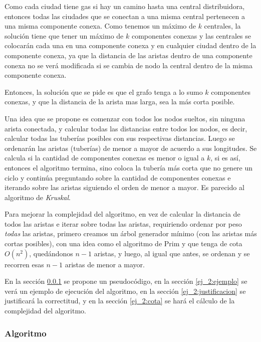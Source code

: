 Como cada ciudad tiene gas si hay un camino hasta una central distribuidora, entonces todas las ciudades que se conectan
a una misma central pertenecen a una misma componente conexa. Como tenemos un m\'aximo de $k$ centrales, la soluci\'on tiene que tener un m\'aximo de $k$ componentes conexas y las centrales se colocar\'an cada una en una componente conexa y en cualquier ciudad dentro de la componente conexa, ya que la distancia de las aristas dentro de una componente conexa no se ver\'a modificada si se cambia de nodo la central dentro de la misma componente conexa.

Entonces, la soluci\'on que se pide es que el grafo tenga a lo sumo $k$ componentes conexas, y que la distancia de la arista mas larga, sea la m\'as corta posible.

Una idea que se propone es comenzar con todos los nodos sueltos, sin ninguna arista conectada,
y calcular todas las distancias entre todos los nodos, es decir, calcular todas las tuber\'ias posibles con sus respectivas distancias.
Luego se ordenar\'an las aristas (tuber\'ias) de menor a mayor de acuerdo a sus longitudes.
Se calcula si la cantidad de componentes conexas es menor o igual a $k$, si es as\'i, entonces el algoritmo termina, sino coloca la tuber\'ia m\'as corta que no genere un ciclo y contin\'ua preguntando sobre la cantidad de componentes conexas e iterando sobre las aristas siguiendo el orden de menor a mayor.
Es parecido al algoritmo de \emph{Kruskal}.

Para mejorar la complejidad del algoritmo, en vez de calcular la distancia de todos las aristas e iterar sobre todas las aristas, requiriendo ordenar por peso \emph{todas} las aristas, primero creamos un \'arbol generador m\'inimo (con las aristas m\'as cortas posibles), con una idea como el algoritmo de Prim y que tenga de cota $O(n^2)$,
qued\'andonos $n - 1$ aristas, y luego, al igual que antes, se ordenan y se recorren esas $n - 1$ aristas de menor a mayor.

En la secci\'on \ref{ej_2:algoritmo} se propone un pseudoc\'odigo, en la secci\'on \ref{ej_2:ejemplo} se ver\'a un ejemplo de ejecuci\'on del algoritmo,
en la secci\'on \ref{ej_2:justificacion} se justificar\'a la correctitud, y en la secci\'on \ref{ej_2:cota} se har\'a el c\'alculo de la complejidad del algoritmo.

\subsubsection{Algoritmo} \label{ej_2:algoritmo}

